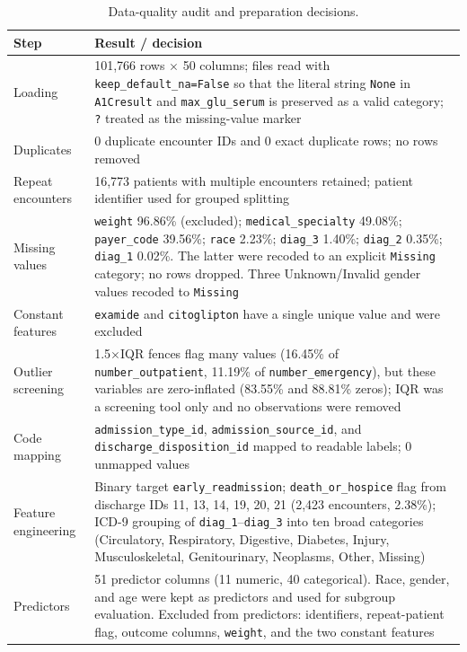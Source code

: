 \documentclass[10pt,a4paper]{article}
\begin{document}
\begin{table}[H]
\centering
\caption{Data-quality audit and preparation decisions.}
\label{tab:dq}
\small
\begin{tabularx}{\textwidth}{lY}
\toprule
Step & Result / decision\\
\midrule
Loading & 101,766 rows $\times$ 50 columns; files read with \texttt{keep\_default\_na=False} so that the literal string \texttt{None} in \texttt{A1Cresult} and \texttt{max\_glu\_serum} is preserved as a valid category; \texttt{?} treated as the missing-value marker\\
Duplicates & 0 duplicate encounter IDs and 0 exact duplicate rows; no rows removed\\
Repeat encounters & 16,773 patients with multiple encounters retained; patient identifier used for grouped splitting\\
Missing values & \texttt{weight} 96.86\% (excluded); \texttt{medical\_specialty} 49.08\%; \texttt{payer\_code} 39.56\%; \texttt{race} 2.23\%; \texttt{diag\_3} 1.40\%; \texttt{diag\_2} 0.35\%; \texttt{diag\_1} 0.02\%. The latter were recoded to an explicit \texttt{Missing} category; no rows dropped. Three Unknown/Invalid gender values recoded to \texttt{Missing}\\
Constant features & \texttt{examide} and \texttt{citoglipton} have a single unique value and were excluded\\
Outlier screening & 1.5$\times$IQR fences flag many values (16.45\% of \texttt{number\_outpatient}, 11.19\% of \texttt{number\_emergency}), but these variables are zero-inflated (83.55\% and 88.81\% zeros); IQR was a screening tool only and no observations were removed\\
Code mapping & \texttt{admission\_type\_id}, \texttt{admission\_source\_id}, and \texttt{discharge\_disposition\_id} mapped to readable labels; 0 unmapped values\\
Feature engineering & Binary target \texttt{early\_readmission}; \texttt{death\_or\_hospice} flag from discharge IDs 11, 13, 14, 19, 20, 21 (2,423 encounters, 2.38\%); ICD-9 grouping of \texttt{diag\_1}--\texttt{diag\_3} into ten broad categories (Circulatory, Respiratory, Digestive, Diabetes, Injury, Musculoskeletal, Genitourinary, Neoplasms, Other, Missing)\\
Predictors & 51 predictor columns (11 numeric, 40 categorical). Race, gender, and age were kept as predictors and used for subgroup evaluation. Excluded from predictors: identifiers, repeat-patient flag, outcome columns, \texttt{weight}, and the two constant features\\
\bottomrule
\end{tabularx}
\end{table}
\end{document}
